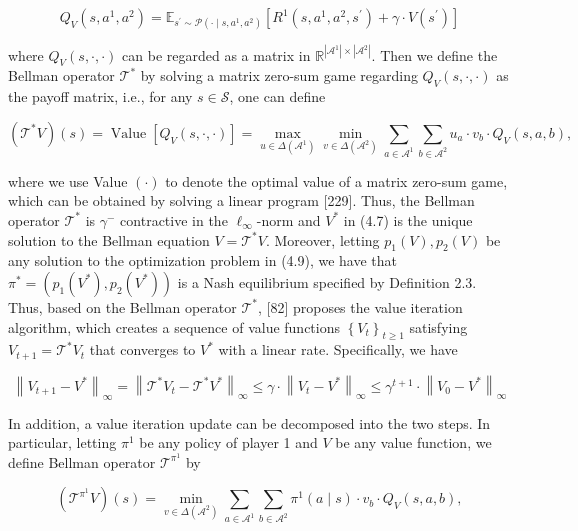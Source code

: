\documentclass[10pt]{article}
\begin{document}
\[
Q_{V}\left(s, a^{1}, a^{2}\right)=\mathbb{E}_{s^{\prime} \sim \mathcal{P}\left(\cdot \mid s, a^{1}, a^{2}\right)}\left[R^{1}\left(s, a^{1}, a^{2}, s^{\prime}\right)+\gamma \cdot V\left(s^{\prime}\right)\right]
\]

where $Q_{V}(s, \cdot, \cdot)$ can be regarded as a matrix in $\mathbb{R}^{\left|\mathcal{A}^{1}\right| \times\left|\mathcal{A}^{2}\right|}$. Then we define the Bellman operator $\mathcal{T}^{*}$ by solving a matrix zero-sum game regarding $Q_{V}(s, \cdot, \cdot)$ as the payoff matrix, i.e., for any $s \in \mathcal{S}$, one can define

\[
\left(\mathcal{T}^{*} V\right)(s)=\operatorname{Value}\left[Q_{V}(s, \cdot, \cdot)\right]=\max _{u \in \Delta\left(\mathcal{A}^{1}\right)} \min _{v \in \Delta\left(\mathcal{A}^{2}\right)} \sum_{a \in \mathcal{A}^{1}} \sum_{b \in \mathcal{A}^{2}} u_{a} \cdot v_{b} \cdot Q_{V}(s, a, b),
\]

where we use Value $(\cdot)$ to denote the optimal value of a matrix zero-sum game, which can be obtained by solving a linear program [229]. Thus, the Bellman operator $\mathcal{T}^{*}$ is $\gamma^{-}$ contractive in the $\ell_{\infty}$-norm and $V^{*}$ in (4.7) is the unique solution to the Bellman equation $V=\mathcal{T}^{*} V$. Moreover, letting $p_{1}(V), p_{2}(V)$ be any solution to the optimization problem in (4.9), we have that $\pi^{*}=\left(p_{1}\left(V^{*}\right), p_{2}\left(V^{*}\right)\right)$ is a Nash equilibrium specified by Definition 2.3. Thus, based on the Bellman operator $\mathcal{T}^{*}$, [82] proposes the value iteration algorithm, which creates a sequence of value functions $\left\{V_{t}\right\}_{t \geq 1}$ satisfying $V_{t+1}=\mathcal{T}^{*} V_{t}$ that converges to $V^{*}$ with a linear rate. Specifically, we have

\[
\left\|V_{t+1}-V^{*}\right\|_{\infty}=\left\|\mathcal{T}^{*} V_{t}-\mathcal{T}^{*} V^{*}\right\|_{\infty} \leq \gamma \cdot\left\|V_{t}-V^{*}\right\|_{\infty} \leq \gamma^{t+1} \cdot\left\|V_{0}-V^{*}\right\|_{\infty}
\]

In addition, a value iteration update can be decomposed into the two steps. In particular, letting $\pi^{1}$ be any policy of player 1 and $V$ be any value function, we define Bellman operator $\mathcal{T}^{\pi^{1}}$ by

\[
\left(\mathcal{T}^{\pi^{1}} V\right)(s)=\min _{v \in \Delta\left(\mathcal{A}^{2}\right)} \sum_{a \in \mathcal{A}^{1}} \sum_{b \in \mathcal{A}^{2}} \pi^{1}(a \mid s) \cdot v_{b} \cdot Q_{V}(s, a, b),
\]
\end{document}
